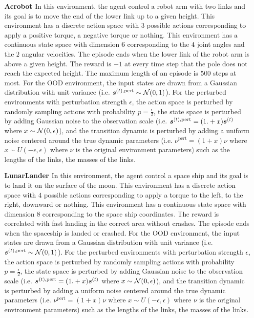 \textbf{Acrobot \citep{acrobot1, acrobot2}} In this environment, the agent control a robot arm with two links and its goal is to move the end of the lower link up to a given height. This environment has a discrete action space with $3$ possible actions corresponding to apply a positive torque, a negative torque or nothing. This environment has a continuous state space with dimension $6$ corresponding to the $4$ joint angles and the $2$ angular velocities. The episode ends when the lower link of the robot arm is above a given height. The reward is $-1$ at every time step that the pole does not reach the expected height. The maximum length of an episode is 500 steps at most. For the OOD environment, the input states are drawn from a Gaussian distribution with unit variance (i.e. $\bm{s}^{(t), \text{pert}} \sim \operatorname{\mathcal{N}}(0, 1)$). For the perturbed environments with perturbation strength $\epsilon$, the action space is perturbed by randomly sampling actions with probability $p=\frac{\epsilon}{2}$, the state space is perturbed by adding Gaussian noise to the observation scale (i.e. $\bm{s}^{(t), \text{pert}} = (1. + x)\bm{s}^{(t)}$ where $x \sim \operatorname{\mathcal{N}}(0, \epsilon)$), and the transition dynamic is perturbed by adding a uniform noise centered around the true dynamic parameters (i.e. $\nu^{\text{pert}} = (1 + x) \nu$ where $x \sim U(-\epsilon, \epsilon)$ where $\nu$ is the original environment parameters) such as the lengths of the links, the masses of the links.

\textbf{LunarLander \citep{lunarlander1, lunarlander2}} In this environment, the agent control a space ship and its goal is to land it on the surface of the moon. This environment has a discrete action space with $4$ possible actions corresponding to apply a torque to the left, to the right, downward or nothing. This environment has a continuous state space with dimension $8$ corresponding to the space ship coordinates. The reward is correlated with fast landing in the correct area without crashes. The episode ends when the spaceship is landed or crashed. For the OOD environment, the input states are drawn from a Gaussian distribution with unit variance (i.e. $\bm{s}^{(t), \text{pert}} \sim \operatorname{\mathcal{N}}(0, 1)$). For the perturbed environments with perturbation strength $\epsilon$, the action space is perturbed by randomly sampling actions with probability $p=\frac{\epsilon}{2}$, the state space is perturbed by adding Gaussian noise to the observation scale (i.e. $\bm{s}^{(t), \text{pert}} = (1. + x)\bm{s}^{(t)}$ where $x \sim \operatorname{\mathcal{N}}(0, \epsilon)$), and the transition dynamic is perturbed by adding a uniform noise centered around the true dynamic parameters (i.e. $\nu^{\text{pert}} = (1 + x) \nu$ where $x \sim U(-\epsilon, \epsilon)$ where $\nu$ is the original environment parameters) such as the lengths of the links, the masses of the links.

